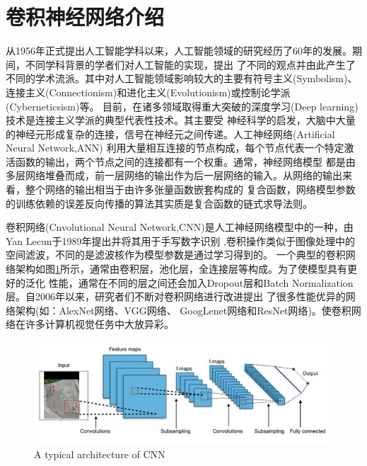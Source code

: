 \section{卷积神经网络介绍}
	从1956年正式提出人工智能学科以来，人工智能领域的研究经历了60年的发展。期间，不同学科背景的学者们对人工智能的实现，提出
	了不同的观点并由此产生了不同的学术流派。其中对人工智能领域影响较大的主要有符号主义(Symbolism)、
	连接主义(Connectionism)和进化主义(Evolutionism)或控制论学派(Cyberneticsism)等。
	目前，在诸多领域取得重大突破的深度学习(Deep learning)技术是连接主义学派的典型代表性技术。其主要受
	神经科学的启发，大脑中大量的神经元形成复杂的连接，信号在神经元之间传递。人工神经网络(Artificial Neural Network,ANN)
	利用大量相互连接的节点构成，每个节点代表一个特定激活函数的输出，两个节点之间的连接都有一个权重。通常，神经网络模型
	都是由多层网络堆叠而成，前一层网络的输出作为后一层网络的输入。从网络的输出来看，整个网络的输出相当于由许多张量函数嵌套构成的
	复合函数，网络模型参数的训练依赖的误差反向传播的算法其实质是复合函数的链式求导法则。
	
	卷积网络(Cnvolutional Neural Network,CNN)是人工神经网络模型中的一种，由Yan Lecun于1989年提出并将其用于手写数字识别
	\cite{le1989handwritten},卷积操作类似于图像处理中的空间滤波，不同的是滤波核作为模型参数是通过学习得到的。
	一个典型的卷积网络架构如图\ref{fig:chap4:cnn}所示，通常由卷积层，池化层，全连接层等构成。为了使模型具有更好的泛化
	性能，通常在不同的层之间还会加入Dropout层和Batch Normalization层。自2006年以来，研究者们不断对卷积网络进行改进提出
	了很多性能优异的网络架构(如：AlexNet网络\cite{krizhevsky2012imagenet}、VGG网络\cite{simonyan2014very}、
	GoogLenet网络\cite{szegedy2015going}和ResNet网络\cite{Kaiming2015Deep})。使卷积网络在许多计算机视觉任务中大放异彩。
	\begin{figure}[h]
	  \centering
	  \includegraphics[width=12cm]{figure/chap4/CNN-arch.png}
		{A typical architecture of CNN}
	  \label{fig:chap4:cnn}
	\end{figure}
